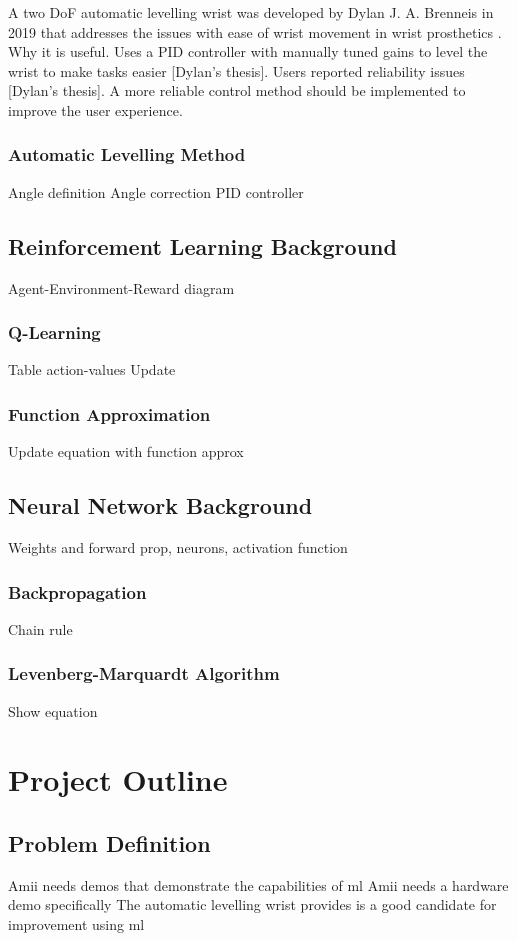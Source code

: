 \documentclass[letterpaper,12pt]{article}
\begin{document}
A two DoF automatic levelling wrist was developed by Dylan J. A. Brenneis in 2019 that addresses the issues with ease of wrist movement in wrist prosthetics \cite{d.j.a.brenneis}. Why it is useful. Uses a PID controller with manually tuned gains to level the wrist to make tasks easier [Dylan's thesis]. Users reported reliability issues [Dylan's thesis]. A more reliable control method should be implemented to improve the user experience.
\subsubsection{Automatic Levelling Method}
Angle definition
Angle correction
PID controller





\subsection{Reinforcement Learning Background}
Agent-Environment-Reward diagram
\subsubsection{Q-Learning}
Table action-values
Update
\subsubsection{Function Approximation}
Update equation with function approx

\subsection{Neural Network Background}
Weights and forward prop, neurons, activation function
\subsubsection{Backpropagation}
Chain rule
\subsubsection{Levenberg-Marquardt Algorithm}
Show equation


\section{Project Outline}
\subsection{Problem Definition}
Amii needs demos that demonstrate the capabilities of ml
Amii needs a hardware demo specifically
The automatic levelling wrist provides is a good candidate for improvement using ml
\end{document}
